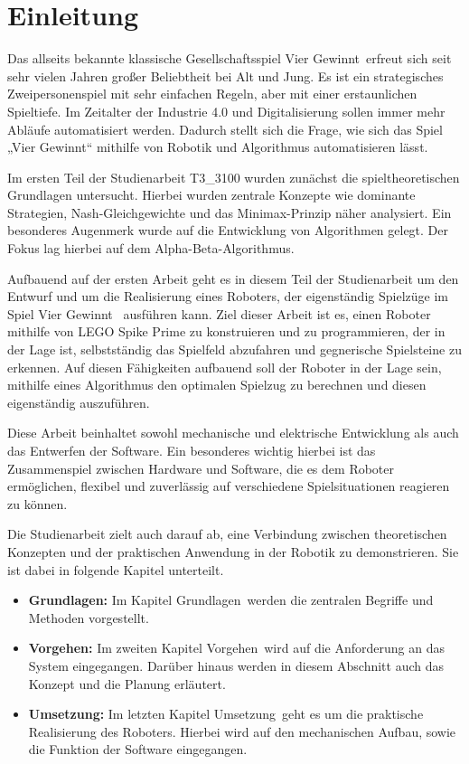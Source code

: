 \chapter{Einleitung}

Das allseits bekannte klassische Gesellschaftsspiel \glqq Vier Gewinnt\grqq~erfreut sich seit sehr vielen Jahren großer Beliebtheit bei Alt und Jung. Es ist ein strategisches Zweipersonenspiel mit sehr einfachen Regeln, aber mit einer erstaunlichen Spieltiefe. Im Zeitalter der Industrie 4.0 und Digitalisierung sollen immer mehr Abläufe automatisiert werden. Dadurch stellt sich die Frage, wie sich das Spiel „Vier Gewinnt“ mithilfe von Robotik und Algorithmus automatisieren lässt.    

Im ersten Teil der Studienarbeit T3\_3100 wurden zunächst die spieltheoretischen Grundlagen untersucht. Hierbei wurden zentrale Konzepte wie dominante Strategien, Nash-Gleichgewichte und das Minimax-Prinzip näher analysiert. Ein besonderes Augenmerk wurde auf die Entwicklung von Algorithmen gelegt. Der Fokus lag hierbei auf dem Alpha-Beta-Algorithmus.

Aufbauend auf der ersten Arbeit geht es in diesem Teil der Studienarbeit um den Entwurf und um die Realisierung eines Roboters, der eigenständig Spielzüge im Spiel \glqq Vier Gewinnt\grqq~ ausführen kann. Ziel dieser Arbeit ist es, einen Roboter mithilfe von LEGO Spike Prime zu konstruieren und zu programmieren, der in der Lage ist, selbstständig das Spielfeld abzufahren und gegnerische Spielsteine zu erkennen. Auf diesen Fähigkeiten aufbauend soll der Roboter in der Lage sein, mithilfe eines Algorithmus den optimalen Spielzug zu berechnen und diesen eigenständig auszuführen.

Diese Arbeit beinhaltet sowohl mechanische und elektrische Entwicklung als auch das Entwerfen der Software. Ein besonderes wichtig hierbei ist das Zusammenspiel zwischen Hardware und Software, die es dem Roboter ermöglichen, flexibel und zuverlässig auf verschiedene Spielsituationen reagieren zu können.

Die Studienarbeit zielt auch darauf ab, eine Verbindung zwischen theoretischen Konzepten und der praktischen Anwendung in der Robotik zu demonstrieren. Sie ist dabei in folgende Kapitel unterteilt.

\begin{itemize}
	\item \textbf{Grundlagen:} Im Kapitel \glqq Grundlagen\grqq~werden die zentralen Begriffe und Methoden vorgestellt.
	\item \textbf{Vorgehen:} Im zweiten Kapitel \glqq Vorgehen\grqq~wird auf die Anforderung an das System eingegangen. Darüber hinaus werden in diesem Abschnitt auch das Konzept und die Planung erläutert.
	\item \textbf{Umsetzung:} Im letzten Kapitel \glqq Umsetzung\grqq~geht es um die praktische Realisierung des Roboters. Hierbei wird auf den mechanischen Aufbau, sowie die Funktion der Software eingegangen. 
\end{itemize}
